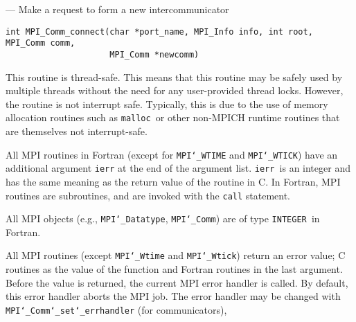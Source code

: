 \startmanpage
{}
--- Make a request to form a new intercommunicator 
\startvb\begin{verbatim}
int MPI_Comm_connect(char *port_name, MPI_Info info, int root, MPI_Comm comm, 
                     MPI_Comm *newcomm)

\end{verbatim}
\endvb

\par
{}
\par
{}
\par
This routine is thread-safe.  This means that this routine may be
safely used by multiple threads without the need for any user-provided
thread locks.  However, the routine is not interrupt safe.  Typically,
this is due to the use of memory allocation routines such as {\tt malloc
}or other non-MPICH runtime routines that are themselves not interrupt-safe.
\par
{}
All MPI routines in Fortran (except for {\tt MPI{\tt \char`\_}WTIME} and {\tt MPI{\tt \char`\_}WTICK}) have
an additional argument {\tt ierr} at the end of the argument list.  {\tt ierr
}is an integer and has the same meaning as the return value of the routine
in C.  In Fortran, MPI routines are subroutines, and are invoked with the
{\tt call} statement.
\par
All MPI objects (e.g., {\tt MPI{\tt \char`\_}Datatype}, {\tt MPI{\tt \char`\_}Comm}) are of type {\tt INTEGER
}in Fortran.
\par
{}
\par
All MPI routines (except {\tt MPI{\tt \char`\_}Wtime} and {\tt MPI{\tt \char`\_}Wtick}) return an error value;
C routines as the value of the function and Fortran routines in the last
argument.  Before the value is returned, the current MPI error handler is
called.  By default, this error handler aborts the MPI job.  The error handler
may be changed with {\tt MPI{\tt \char`\_}Comm{\tt \char`\_}set{\tt \char`\_}errhandler} (for communicators),

